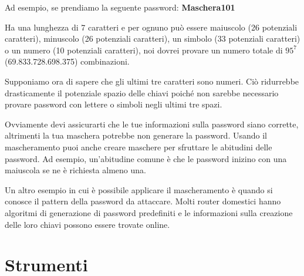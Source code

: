Ad esempio, se prendiamo la seguente password: \textbf{Maschera101}

Ha una lunghezza di 7 caratteri e per ognuno può essere maiuscolo (26 potenziali caratteri), minuscolo (26 potenziali caratteri), un simbolo (33 potenziali caratteri) o un numero (10 potenziali caratteri), noi dovrei provare un numero totale di \({95}^{7}\) (69.833.728.698.375) combinazioni.

Supponiamo ora di sapere che gli ultimi tre caratteri sono numeri. Ciò ridurrebbe drasticamente il potenziale spazio delle chiavi poiché non sarebbe necessario provare password con lettere o simboli negli ultimi tre spazi.

Ovviamente devi assicurarti che le tue informazioni sulla password siano corrette, altrimenti la tua maschera potrebbe non generare la password. Usando il mascheramento puoi anche creare maschere per sfruttare le abitudini delle password. Ad esempio, un'abitudine comune è che le password inizino con una maiuscola se ne è richiesta almeno una.

Un altro esempio in cui è possibile applicare il mascheramento è quando si conosce il pattern della password da attaccare. Molti router domestici hanno algoritmi di generazione di password predefiniti e le informazioni sulla creazione delle loro chiavi possono essere trovate online.

\section{Strumenti}